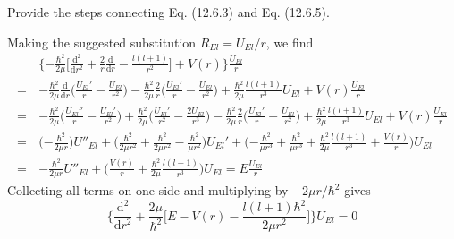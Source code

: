 \documentclass[../principles-of-quantum-mechanics.tex]{subfiles}
\begin{document}
\begin{questions}
		\question Provide the steps connecting Eq. (12.6.3) and Eq. (12.6.5).
		\begin{solution}
			Making the suggested substitution $R_{El} = U_{El}/r$, we find
			\begin{align*}
				&\Big\{{-\frac{\hbar^2}{2\mu}}\Big[\frac{\mathrm{d}^2}{\mathrm{d} r^2} + \frac{2}{r}\frac{\mathrm{d}}{\mathrm{d} r} - \frac{l(l + 1)}{r^2}\Big] + V(r)\Big\}\frac{U_{El}}{r} \\
				=\,&{-\frac{\hbar^2}{2\mu}}\frac{\mathrm{d}}{\mathrm{d}r}\Big(\frac{U_{El}'}{r} - \frac{U_{El}}{r^2}\Big) - \frac{\hbar^2}{2\mu}\frac{2}{r}\Big(\frac{U_{El}'}{r} - \frac{U_{El}}{r^2}\Big) + \frac{\hbar^2}{2\mu}\frac{l(l + 1)}{r^3}U_{El} + V(r)\frac{U_{El}}{r} \\
				=\,&{-\frac{\hbar^2}{2\mu}}\Big(\frac{U_{El}''}{r} - \frac{U_{El}'}{r^2}\Big) + \frac{\hbar^2}{2\mu}\Big(\frac{U_{El}'}{r^2} - \frac{2U_{El}}{r^3}\Big) - \frac{\hbar^2}{2\mu}\frac{2}{r}\Big(\frac{U_{El}'}{r} - \frac{U_{El}}{r^2}\Big) + \frac{\hbar^2}{2\mu}\frac{l(l + 1)}{r^3}U_{El} + V(r)\frac{U_{El}}{r} \\
				=\,&\Big({-\frac{\hbar^2}{2\mu r}}\Big)U''_{El} + \Big(\frac{\hbar^2}{2\mu r^2} + \frac{\hbar^2}{2\mu r^2} - \frac{\hbar^2}{\mu r^2}\Big)U_{El}' + \Big({-\frac{\hbar^2}{\mu r^3}} + \frac{\hbar^2}{\mu r^3} + \frac{\hbar^2}{2\mu}\frac{l(l + 1)}{r^3} + \frac{V(r)}{r}\Big)U_{El} \\
				=\,&{-\frac{\hbar^2}{2\mu r}}U''_{El} + \Big(\frac{V(r)}{r} + \frac{\hbar^2}{2\mu}\frac{l(l + 1)}{r^3}\Big)U_{El} = E\frac{U_{El}}{r}
			\end{align*}
			Collecting all terms on one side and multiplying by $-2\mu r/\hbar^2$ gives
			$$\Big\{\frac{\mathrm{d}^2}{\mathrm{d}r^2} + \frac{2\mu}{\hbar^2}\Big[E - V(r) - \frac{l(l + 1)\hbar^2}{2\mu r^2}\Big]\Big\}U_{El} = 0$$
		\end{solution}
	

\end{questions}
\end{document}
